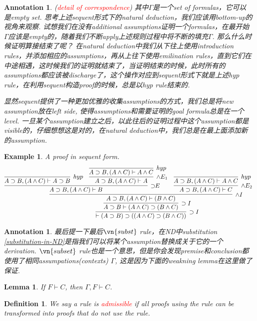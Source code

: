 \documentclass{article}
\theoremstyle{plain}
\newtheorem{lemma}[theorem]{Lemma}
\newtheorem{example}[theorem]{Example}
\newtheorem{definition}[theorem]{Definition}
\newtheorem{annotation}[theorem]{Annotation}
\theoremstyle{nonumberplain}
\newcommand{\redt}[1]{\textcolor{red}{#1}}
\begin{document}
\begin{annotation}
\rm (\redt{detail of correspondence}) 其中$\Gamma$是一个set of formulas，它可以是empty set. 思考上述sequent形式下的natural deduction，我们应该用bottom-up的视角来观察. 试想我们在没有additional assumptions证明一个formulas，在最开始$\Gamma$应该是empty的，随着我们不断apply上述规则过程中将不断的填充$\Gamma$. 那么什么时候证明算接结束了呢？ 在natural deduction中我们从下往上使用introduction rules，并添加相应的assumptions，再从上往下使用emilination rules，直到它们在中途相遇，这时候我们的证明就结束了，当证明结束的时候，此时所有的assumptions都应该被discharge了，这个操作对应到sequent形式下就是上述hyp rule，在利用sequent构造proof的时候，总是以hyp rule结束的.

显然sequent提供了一种更加优雅的收集assumptions的方式，我们总是将new assumption放在left side, 使得assumptions和需要证明的goal formula总是在一个level. 一旦某个assumption建立之后，以此往后的证明过程中这个assumption都是visible的，仔细想想这是对的，在natural deduction中，我们总是在最上面添加新的assumption. 
\end{annotation}


\begin{example}
\rm A proof in sequent form.
$$
\infer[\supset I]{\vdash (A \supset B) \supset ((A\wedge C) \supset (B \wedge C) ) }{\infer[\supset I]{A \supset B \vdash (A\wedge C) \supset (B \wedge C)}{\infer[\wedge I]{A \supset B,(A\wedge C) \vdash  (B \wedge C)}{\infer[\supset\!\!E]{A \supset B,(A\wedge C) \vdash B}{\infer[hyp]{A \supset B,(A\wedge C) \vdash A \supset B}{} & \infer[\wedge E_1]{A \supset B,(A\wedge C) \vdash A}{\infer[hyp]{A \supset B,(A\wedge C) \vdash A \wedge C}{}} } & \infer[\wedge E_2]{A \supset B,(A\wedge C) \vdash C}{\infer[hyp]{A \supset B,(A\wedge C) \vdash A \wedge C}{}}}}}
$$
\end{example}

\begin{annotation}
\rm 最后提一下最后$\vn{subst}$ rule，在ND中substitution \ref{substitution-in-ND}是指我们可以将某个assumption替换成关于它的一个derivation. $\vn{subset}$ rule也是一个意思，但是你会发现premise和conclusion都使用了相同assumpations(contexts) $\Gamma$, 这是因为下面的weakning lemma在这里做了保证.
\end{annotation}

\begin{lemma}
\rm If $F \vdash C$, then $\Gamma, F \vdash C$.
\end{lemma}

\begin{definition}
\rm We say a rule is \redt{admissible} if all proofs using the rule can be transformed into proofs that do not use the rule.
\end{definition}
\end{document}
